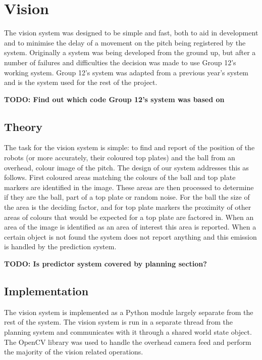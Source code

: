 \newcommand\visiontodo[1]{\textbf{TODO: #1}}

\section{Vision}

The vision system was designed to be simple and fast, both to aid in
development and to minimise the delay of a movement on the pitch being
registered by the system. Originally a system was being developed from the
ground up, but after a number of failures and difficulties the decision was
made to use Group 12's working system. Group 12's system was adapted from a
previous year's system and is the system used for the rest of the project.

\visiontodo{Find out which code Group 12's system was based on}

\subsection{Theory}

The task for the vision system is simple: to find and report of the position of
the robots (or more accurately, their coloured top plates) and the ball from an
overhead, colour image of the pitch. The design of our system addresses this as
follows. First coloured areas matching the colours of the ball and top plate
markers are identified in the image. These areas are then processed to
determine if they are the ball, part of a top plate or random noise. For the
ball the size of the area is the deciding factor, and for top plate markers the
proximity of other areas of colours that would be expected for a top plate are
factored in. When an area of the image is identified as an area of interest
this area is reported. When a certain object is not found the system does not
report anything and this emission is handled by the prediction system.

\visiontodo{Is predictor system covered by planning section?}

\subsection{Implementation}

The vision system is implemented as a Python module largely separate from the
rest of the system. The vision system is run in a separate thread from the
planning system and communicates with it through a shared world state object.
The OpenCV library was used to handle the overhead camera feed and perform the
majority of the vision related operations.

